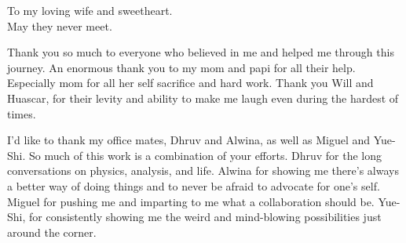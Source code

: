 \documentclass{ucbthesis}
\begin{document}
\begin{frontmatter}

\begin{dedication}
\begin{center}
\vfil\null
To my loving wife and sweetheart.\\\vspace{12pt}
May they never meet.

\end{center}
\vfil\null
\end{dedication}


\tableofcontents
\clearpage
\listoffigures
\clearpage
\listoftables


\begin{acknowledgements}
Thank you so much to everyone who believed in me and helped me through this journey.
An enormous thank you to my mom and papi for all their help. Especially mom for all her self sacrifice and hard work. Thank you Will and Huascar, for their levity  and ability to make me laugh even during the hardest of times. 

I'd like to thank my office mates, Dhruv and Alwina, as well as Miguel and Yue-Shi. So much of this work is a combination of your efforts. Dhruv for the long conversations on physics, analysis, and life. Alwina for showing me there's always a better way of doing things and to never be afraid to advocate for one's self. Miguel for pushing me and imparting to me what a collaboration should be. Yue-Shi, for consistently showing me the weird and mind-blowing possibilities just around the corner. 


\end{acknowledgements}
\end{frontmatter}
\end{document}
